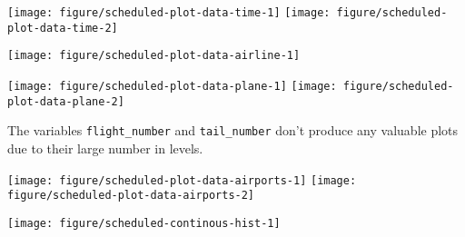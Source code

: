 \documentclass{article}\usepackage[]{graphicx}\usepackage[]{color}
\newenvironment{knitrout}{}{} %
\begin{document}
\begin{knitrout}
\color{fgcolor}

{\centering \texttt{[image: figure/scheduled-plot-data-time-1]} 
\texttt{[image: figure/scheduled-plot-data-time-2]} 

}



\end{knitrout}
  
\begin{knitrout}
\color{fgcolor}

{\centering \texttt{[image: figure/scheduled-plot-data-airline-1]} 

}



\end{knitrout}
  
\begin{knitrout}
\color{fgcolor}

{\centering \texttt{[image: figure/scheduled-plot-data-plane-1]} 
\texttt{[image: figure/scheduled-plot-data-plane-2]} 

}



\end{knitrout}
  
The variables \verb+flight_number+ and \verb+tail_number+ don't produce any valuable plots due to their large number in levels.

\begin{landscape}
\begin{knitrout}
\color{fgcolor}

{\centering \texttt{[image: figure/scheduled-plot-data-airports-1]} 
\texttt{[image: figure/scheduled-plot-data-airports-2]} 

}



\end{knitrout}
\vspace{3 mm}

\begin{knitrout}
\color{fgcolor}

{\centering \texttt{[image: figure/scheduled-continous-hist-1]} 

}



\end{knitrout}
\end{landscape}
\end{document}
